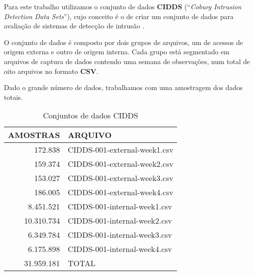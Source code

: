 \documentclass[twoside]{article}
\begin{document}
Para este trabalho utilizamos o conjunto de dados \textbf{CIDDS} (``\textit{Coburg Intrusion Detection Data Sets}''), cujo conceito é o de criar um conjunto de dados para avaliação de sistemas de detecção de intrusão \cite{ring2017creation,ring2017flow}.

O conjunto de dados é composto por dois grupos de arquivos, um de acessos de origem externa e outro de origem interna. Cada grupo está segmentado em arquivos de captura de dados contendo uma semana de observações, num total de oito arquivos no formato \textbf{CSV}.

Dado o grande número de dados, trabalhamos com uma amostragem dos dados totais.

\begin{table}\scriptsize
    \centering
    \begin{tabular}{rl}
        \toprule
        AMOSTRAS &  ARQUIVO \\
        \midrule
           172.838 & CIDDS-001-external-week1.csv \\
           159.374 & CIDDS-001-external-week2.csv \\
           153.027 & CIDDS-001-external-week3.csv \\
           186.005 & CIDDS-001-external-week4.csv \\
         8.451.521 & CIDDS-001-internal-week1.csv \\
        10.310.734 & CIDDS-001-internal-week2.csv \\
         6.349.784 & CIDDS-001-internal-week3.csv \\
         6.175.898 & CIDDS-001-internal-week4.csv \\
        31.959.181 & TOTAL \\
        \bottomrule
    \end{tabular}
    \caption{Conjuntos de dados CIDDS}
    \label{tab:tab:dataset}
\normalsize\end{table}
\end{document}

